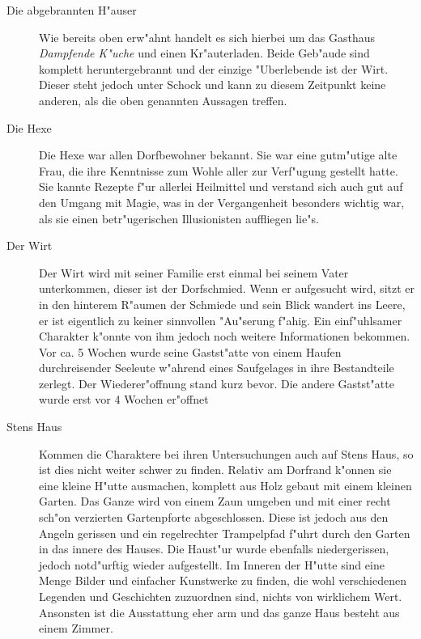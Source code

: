 \begin{description}
\item [Die abgebrannten H"auser] Wie bereits oben erw"ahnt handelt es sich hierbei um das Gasthaus \textit{Dampfende K"uche} und einen Kr"auterladen. Beide Geb"aude sind komplett heruntergebrannt und der einzige "Uberlebende ist der Wirt. Dieser steht jedoch unter Schock und kann zu diesem Zeitpunkt keine anderen, als die oben genannten Aussagen treffen.
\item [Die Hexe] Die Hexe war allen Dorfbewohner bekannt. Sie war eine gutm"utige alte Frau, die ihre Kenntnisse zum Wohle aller zur Verf"ugung gestellt hatte. Sie kannte Rezepte f"ur allerlei Heilmittel und verstand sich auch gut auf den Umgang mit Magie, was in der Vergangenheit besonders wichtig war, als sie einen betr"ugerischen Illusionisten auffliegen lie"s.
\item [Der Wirt] Der Wirt wird mit seiner Familie erst einmal bei seinem Vater unterkommen, dieser ist der Dorfschmied. Wenn er aufgesucht wird, sitzt er in den hinterem R"aumen der Schmiede und sein Blick wandert ins Leere, er ist eigentlich zu keiner sinnvollen "Au"serung f"ahig. Ein einf"uhlsamer Charakter k"onnte von ihm jedoch noch weitere Informationen bekommen. Vor ca. 5 Wochen wurde seine Gastst"atte von einem Haufen durchreisender Seeleute w"ahrend eines Saufgelages in ihre Bestandteile zerlegt. Der Wiederer"offnung stand kurz bevor. Die andere Gastst"atte wurde erst vor 4 Wochen er"offnet
\item [Stens Haus] Kommen die Charaktere bei ihren Untersuchungen auch auf Stens Haus, so ist dies nicht weiter schwer zu finden. Relativ am Dorfrand k"onnen sie eine kleine H"utte ausmachen, komplett aus Holz gebaut mit einem kleinen Garten. Das Ganze wird von einem Zaun umgeben und mit einer recht sch"on verzierten Gartenpforte abgeschlossen. Diese ist jedoch aus den Angeln gerissen und ein regelrechter Trampelpfad f"uhrt durch den Garten in das innere des Hauses. Die Haust"ur wurde ebenfalls niedergerissen, jedoch notd"urftig wieder aufgestellt. Im Inneren der H"utte sind eine Menge Bilder und einfacher Kunstwerke zu finden, die wohl verschiedenen Legenden und Geschichten zuzuordnen sind, nichts von wirklichem Wert. Ansonsten ist die Ausstattung eher arm und das ganze Haus besteht aus einem Zimmer.
\end{description}

